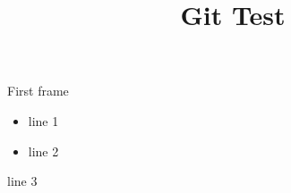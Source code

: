 \documentclass[10pt]{beamer}
\newcommand{\handoutgap}[1]{\invisible<0| handout:1->{#1}} %
\begin{document}
	
	\title{Git Test}
	\frame{\titlepage}
	

\begin{frame}{First frame}

\begin{minipage}{.5\textwidth}
	\begin{itemize}
		\item line 1
		\item line 2
	\end{itemize}
\end{minipage}
\begin{minipage}{.4\textwidth}
	line 3
\end{minipage}

\end{frame}

%			
\end{document}
